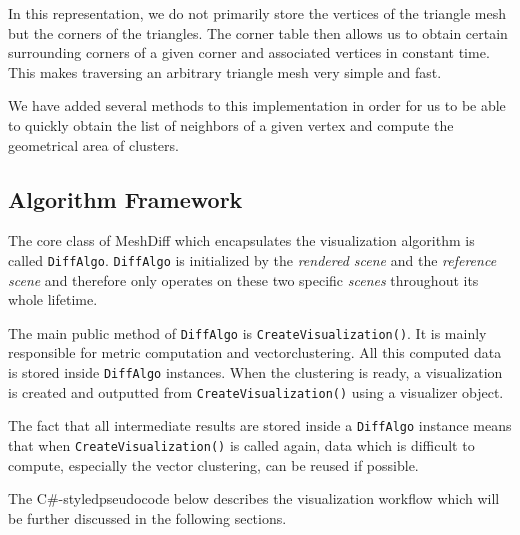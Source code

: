 In this representation, we do not primarily store the vertices of the triangle mesh but the corners of the triangles. The corner table then allows us to obtain certain surrounding corners of a given corner and associated vertices in constant time. This makes traversing an arbitrary triangle mesh very simple and fast.

We have added several methods to this implementation in order for us to be able to quickly obtain the list of neighbors of a given vertex and compute the geometrical area of clusters.

\subsection{Algorithm Framework}
\label{subsec:implementation-algorithm-framework}

The core class of MeshDiff which encapsulates the visualization algorithm is called \verb+DiffAlgo+. \verb+DiffAlgo+ is initialized by the {\it rendered scene} and the {\it reference scene} and therefore only operates on these two specific {\it scenes} throughout its whole lifetime.

The main public method of \verb+DiffAlgo+ is \verb+CreateVisualization()+. It is mainly responsible for metric computation and vector\footnotemark clustering. All this computed data is stored inside \verb+DiffAlgo+ instances. When the clustering is ready, a visualization is created and outputted from \verb+CreateVisualization()+ using a visualizer object.


The fact that all intermediate results are stored inside a \verb+DiffAlgo+ instance means that when \verb+CreateVisualization()+ is called again, data which is difficult to compute, especially the vector clustering, can be reused if possible.

The C\#-styled\footnotemark pseudocode below describes the visualization workflow which will be further discussed in the following sections.



